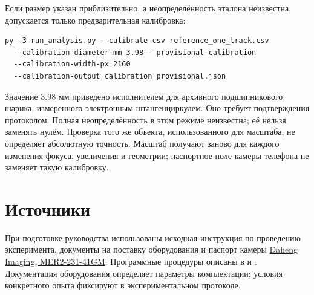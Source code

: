 \documentclass[12pt,a4paper]{article}
\begin{document}
Если размер указан приблизительно, а неопределённость эталона неизвестна, допускается только предварительная калибровка:
\begin{verbatim}
py -3 run_analysis.py --calibrate-csv reference_one_track.csv
  --calibration-diameter-mm 3.98 --provisional-calibration
  --calibration-width-px 2160
  --calibration-output calibration_provisional.json
\end{verbatim}
Значение 3.98 мм приведено исполнителем для архивного подшипникового шарика, измеренного электронным штангенциркулем. Оно требует подтверждения протоколом. Полная неопределённость в этом режиме неизвестна; её нельзя заменять нулём. Проверка того же объекта, использованного для масштаба, не определяет абсолютную точность. Масштаб получают заново для каждого изменения фокуса, увеличения и геометрии; паспортное поле камеры телефона не заменяет такую калибровку.

\section{Источники}
При подготовке руководства использованы исходная инструкция по проведению эксперимента, документы на поставку оборудования и паспорт камеры \href{https://en.daheng-imaging.com/show-104-1901-1.html}{Daheng Imaging, MER2-231-41GM}. Программные процедуры описаны в  и . Документация оборудования определяет параметры комплектации; условия конкретного опыта фиксируют в экспериментальном протоколе.
\end{document}
